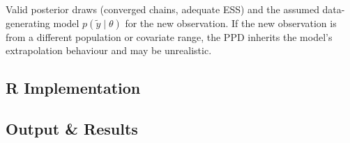 \documentclass[
]{article}
\newenvironment{Shaded}{\begin{snugshade}}{\end{snugshade}}
\newcommand{\AttributeTok}[1]{\textcolor[rgb]{0.13,0.29,0.53}{#1}}
\newcommand{\CommentTok}[1]{\textcolor[rgb]{0.56,0.35,0.01}{\textit{#1}}}
\newcommand{\ConstantTok}[1]{\textcolor[rgb]{0.56,0.35,0.01}{#1}}
\newcommand{\DecValTok}[1]{\textcolor[rgb]{0.00,0.00,0.81}{#1}}
\newcommand{\FloatTok}[1]{\textcolor[rgb]{0.00,0.00,0.81}{#1}}
\newcommand{\FunctionTok}[1]{\textcolor[rgb]{0.13,0.29,0.53}{\textbf{#1}}}
\newcommand{\NormalTok}[1]{#1}
\newcommand{\OtherTok}[1]{\textcolor[rgb]{0.56,0.35,0.01}{#1}}
\newcommand{\SpecialCharTok}[1]{\textcolor[rgb]{0.81,0.36,0.00}{\textbf{#1}}}
\begin{document}
Valid posterior draws (converged chains, adequate ESS) and the assumed
data-generating model \(p(\tilde y \mid \theta)\) for the new
observation. If the new observation is from a different population or
covariate range, the PPD inherits the model's extrapolation behaviour
and may be unrealistic.

\subsection{R Implementation}\label{r-implementation}

\begin{Shaded}
\end{Shaded}

\subsection{Output \& Results}\label{output-results}
\end{document}
